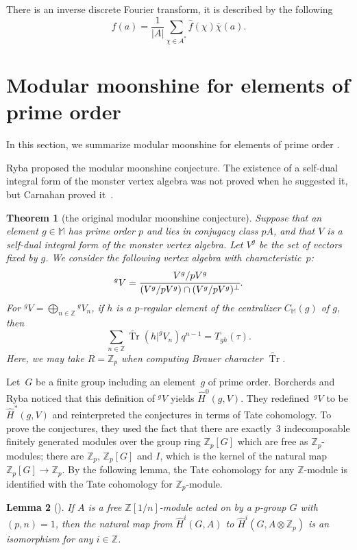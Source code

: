 \documentclass[pdftex]{sigma}%
\numberwithin{equation}{section}
\newtheorem{Theorem}{Theorem}[section]
\newtheorem{Lemma}[Theorem]{Lemma}
\begin{document}
There is an inverse discrete Fourier transform, it is described by the following
\[
f(a)=\frac{1}{|A|}\sum_{\chi \in A^*}\hat{f}(\chi)\overline{\chi}(a).
\]

\section{Modular moonshine for elements of prime order}\label{section3}

In this section, we summarize modular moonshine for elements of prime order \cite{B98,BR}.

Ryba proposed the modular moonshine conjecture. The existence of a self-dual integral form of the monster vertex algebra was not proved when he suggested it, but Carnahan proved it~\cite{C}.

\begin{Theorem}[the original modular moonshine conjecture]
Suppose that an element $g \in \mathbb{M}$ has prime order $p$ and lies in conjugacy class $pA$, and that $V$ is a self-dual integral form of the monster vertex algebra.
Let $V^g$ be the set of vectors fixed by $g$. We consider the following vertex algebra with characteristic~$p$:
 \[
{}^{g}V=\cfrac{V^g/pV^g}{(V^g/pV^g) \cap (V^g/pV^g)^{\perp}} .
\]
For $^{g}V=\bigoplus_{n \in \mathbb{Z}}{^{g}V_n}$, if $h$ is a $p$-regular element of the centralizer $C_{\mathbb{M}}(g)$ of $g$, then
\[
\sum_{n \in \mathbb{Z}} \widetilde{\operatorname{Tr}}(h|^{g}V_n)q^{n-1}=T_{gh}(\tau).
\]
 Here, we may take $R=\mathbb{Z}_p$ when computing Brauer character $\widetilde{\operatorname{Tr}}$.
 \end{Theorem}

Let~$G$ be a finite group including an element~$g$ of prime order. Borcherds and Ryba noticed that this definition of $^gV$ yields $\hat{H}^0(g,V)$. They redefined~$^gV$ to be $\hat{H}^*(g,V)$ and reinterpreted the conjectures in terms of Tate cohomology. To prove the conjectures, they used the fact that there are exactly~3 indecomposable finitely generated modules over the group ring $\mathbb{Z}_p[G]$ which are free as $\mathbb{Z}_p$-modules; there are $\mathbb{Z}_p$, $\mathbb{Z}_p[G]$ and $I$, which is the kernel of the natural map $\mathbb{Z}_p[G]\rightarrow \mathbb{Z}_p$.
By the following lemma, the Tate cohomology for any $\mathbb{Z}$-module is identified with the Tate cohomology for $\mathbb{Z}_p$-module.

\begin{Lemma}[{\cite[Lemma~2.1]{BR}}] \label{Zp}
If $A$ is a free $\mathbb{Z}[1/n]$-module acted on by a $p$-group $G$ with $(p,n)=1$, then the natural map from $\hat{H}^i(G,A)$ to $\hat{H}^i(G,A\otimes \mathbb{Z}_p)$ is an isomorphism for any $i\in \mathbb{Z}$.
\end{Lemma}
\end{document}
